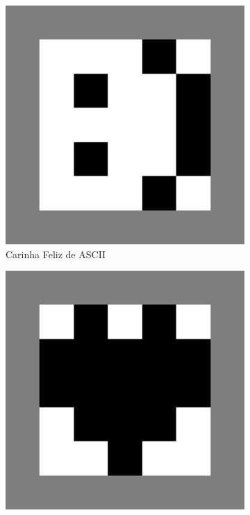 \documentclass{article}
\begin{document}
\begin{figure}[h]
    \centering
    \begin{subfigure}{0.3\textwidth}
        \centering
        \includegraphics[width=0.9\linewidth]{face-border}
        \caption{Carinha Feliz de ASCII}
        \label{p:face}
    \end{subfigure}
    \begin{subfigure}{0.3\textwidth}
        \centering
        \includegraphics[width=0.9\linewidth]{heart-border}

\end{subfigure}
\end{figure}
\end{document}
